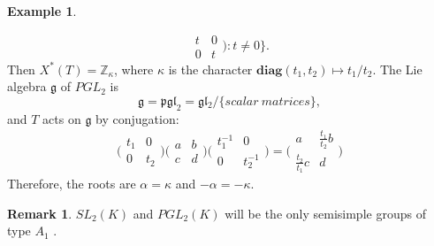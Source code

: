 \documentclass[12pt,a4paper,english]{article}
\theoremstyle{plain}
\theoremstyle{definition}
\newtheorem*{ex}{Example}
\newtheorem*{rem}{Remark}
\begin{document}
\begin{ex}
\begin{enumerate}
\begin{equation*}
\begin{array}{cc}
            t & 0 \\
            0 & t
        \end{array}\bigg): t\not=0\bigg\}.
    \end{equation*}
    Then $X^{*}(T)=\mathbb{Z}_{\kappa}$, where $\kappa$ is the character $\textbf{diag}(t_{1},t_{2})\mapsto t_{1}/t_{2}$. The Lie algebra $\mathfrak{g}$ of $PGL_{2}$ is 
    \begin{equation*}
        \mathfrak{g}=\mathfrak{pgl}_{2}=\mathfrak{gl_{2}}/\{scalar\ matrices\},
    \end{equation*}
    and $T$ acts on $\mathfrak{g}$ by conjugation:
    \begin{equation*}
        \bigg(\begin{array}{cc}
            t_{1} & 0 \\
            0 & t_{2}
        \end{array}\bigg)\bigg(\begin{array}{cc}
            a & b \\
            c & d
        \end{array}\bigg)\bigg(\begin{array}{cc}
            t_{1}^{-1} & 0 \\
            0 & t_{2}^{-1}
        \end{array}\bigg)=\bigg(\begin{array}{cc}
            a & \frac{t_{1}}{t_{2}}b \\
            \frac{t_{2}}{t_{1}}c & d
        \end{array}\bigg)
    \end{equation*}
    Therefore, the roots are $\alpha=\kappa$ and $-\alpha=-\kappa$. 
\end{enumerate}
\end{ex}
\begin{rem}
$SL_{2}(K)$ and $PGL_{2}(K)$ will be the only semisimple groups of type $A_{1}$ \cite{humphreys2012linear}.
\end{rem}
\end{document}

